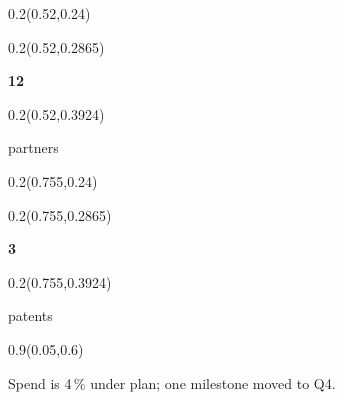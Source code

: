 \documentclass[aspectratio=169]{beamer}
\begin{document}
\begin{frame}[t]
%
\begin{textblock}{0.2}(0.52,0.24)
\end{textblock}

\begin{textblock}{0.2}(0.52,0.2865)
{\centering\fontsize{26}{31}\selectfont \textcolor[HTML]{FFFFFF}{\textbf{12}}\par}
\end{textblock}

\begin{textblock}{0.2}(0.52,0.3924)
{\centering\fontsize{12}{14}\selectfont \textcolor[HTML]{FFFFFF}{partners}\par}
\end{textblock}

%
\begin{textblock}{0.2}(0.755,0.24)
\end{textblock}

\begin{textblock}{0.2}(0.755,0.2865)
{\centering\fontsize{26}{31}\selectfont \textcolor[HTML]{FFFFFF}{\textbf{3}}\par}
\end{textblock}

\begin{textblock}{0.2}(0.755,0.3924)
{\centering\fontsize{12}{14}\selectfont \textcolor[HTML]{FFFFFF}{patents}\par}
\end{textblock}

\begin{textblock}{0.9}(0.05,0.6)
{\centering\fontsize{16}{19}\selectfont Spend is 4\,\% under plan; one milestone moved to Q4.\par}
\end{textblock}
\end{frame}
\end{document}

